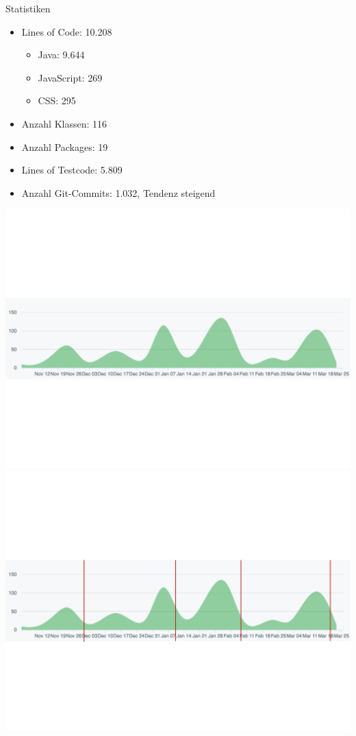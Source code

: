 \documentclass[10pt]{beamer}
\begin{document}
\begin{frame}{Statistiken}{}
	\begin{itemize}
		\item Lines of Code: 10.208
		\begin{itemize}
			\item Java: 9.644
			\item JavaScript: 269
			\item CSS: 295
		\end{itemize}
		\item Anzahl Klassen: 116
		\item Anzahl Packages: 19
		\item Lines of Testcode: 5.809 
		\item Anzahl Git-Commits: 1.032, Tendenz steigend
	\end{itemize}
	
	\begin{overprint}
    \includegraphics[width = \textwidth]{img/GitCommits}
    \includegraphics[width = \textwidth]{img/GitCommitsAbgabe}
    \end{overprint}
\end{frame}
\end{document}
